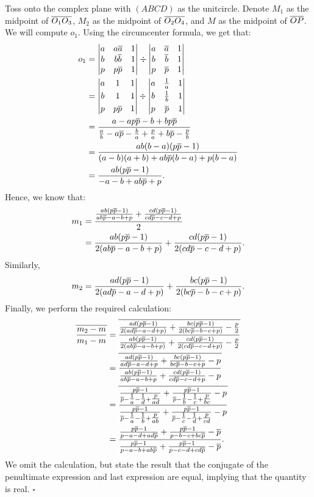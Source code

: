 \documentclass{article}
\begin{document}
Toss onto the complex plane with $(ABCD)$ as the unitcircle. Denote $M_1$ as the midpoint of $\overline{O_1O_3}$, $M_2$ as the midpoint of $\overline{O_2O_4}$, and $M$ as the midpoint of $\overline{OP}$. We will compute $o_1$. Using the circumcenter formula, we get that:
{\allowdisplaybreaks
\begin{align*}
o_1 &= \begin{vmatrix}a&a\overline{a}&1\\b&b\overline{b}&1\\p&p\overline{p}&1\end{vmatrix} \div \begin{vmatrix}a&\overline{a}&1\\b&\overline{b}&1\\p&\overline{p}&1\end{vmatrix} \\
&= \begin{vmatrix}a&1&1\\[3pt]b&1&1\\[3pt]p&p\overline{p}&1\end{vmatrix} \div \begin{vmatrix}a&\tfrac{1}{a}&1\\[3pt]b&\tfrac{1}{b}&1\\[3pt]p&\overline{p}&1\end{vmatrix} \\
&= \dfrac{a-ap\overline{p}-b+bp\overline{p}}{\tfrac{a}{b}-a\overline{p}-\tfrac{b}{a}+\tfrac{p}{a}+b\overline{p}-\tfrac{p}{b}} \\
&= \dfrac{ab(b-a)(p\overline{p}-1)}{(a-b)(a+b)+ab\overline{p}(b-a)+p(b-a)} \\
&= \dfrac{ab(p\overline{p}-1)}{-a-b+ab\overline{p}+p}.
\end{align*}
}
Hence, we know that:
\begin{align*}
m_1 &= \dfrac{\tfrac{ab(p\overline{p}-1)}{ab\overline{p}-a-b+p}+\tfrac{cd(p\overline{p}-1)}{cd\overline{p}-c-d+p}}{2} \\
&= \dfrac{ab(p\overline{p}-1)}{2(ab\overline{p}-a-b+p)}+\dfrac{cd(p\overline{p}-1)}{2(cd\overline{p}-c-d+p)}.
\end{align*}
Similarly, \[m_2 = \dfrac{ad(p\overline{p}-1)}{2(ad\overline{p}-a-d+p)}+\dfrac{bc(p\overline{p}-1)}{2(bc\overline{p}-b-c+p)}.\] Finally, we perform the required calculation:
\begin{align*}
\overline{\dfrac{m_2-m}{m_1-m}} &= \overline{\dfrac{\tfrac{ad(p\overline{p}-1)}{2(ad\overline{p}-a-d+p)}+\tfrac{bc(p\overline{p}-1)}{2(bc\overline{p}-b-c+p)}-\tfrac{p}{2}}{\tfrac{ab(p\overline{p}-1)}{2(ab\overline{p}-a-b+p)}+\tfrac{cd(p\overline{p}-1)}{2(cd\overline{p}-c-d+p)}-\tfrac{p}{2}}} \\
&= \overline{\dfrac{\tfrac{ad(p\overline{p}-1)}{ad\overline{p}-a-d+p}+\tfrac{bc(p\overline{p}-1)}{bc\overline{p}-b-c+p}-p}{\tfrac{ab(p\overline{p}-1)}{ab\overline{p}-a-b+p}+\tfrac{cd(p\overline{p}-1)}{cd\overline{p}-c-d+p}-p}} \\
&= \overline{\dfrac{\tfrac{p\overline{p}-1}{\overline{p}-\tfrac{1}{a}-\tfrac{1}{d}+\tfrac{p}{ad}}+\tfrac{p\overline{p}-1}{\overline{p}-\tfrac{1}{b}-\tfrac{1}{c}+\tfrac{p}{bc}}-p}{\tfrac{p\overline{p}-1}{\overline{p}-\tfrac{1}{a}-\tfrac{1}{b}+\tfrac{p}{ab}}+\tfrac{p\overline{p}-1}{\overline{p}-\tfrac{1}{c}-\tfrac{1}{d}+\tfrac{p}{cd}}-p}} \\
&= \dfrac{\tfrac{p\overline{p}-1}{p-a-d+ad\overline{p}}+\tfrac{p\overline{p}-1}{p-b-c+bc\overline{p}}-\overline{p}}{\tfrac{p\overline{p}-1}{p-a-b+ab\overline{p}}+\tfrac{p\overline{p}-1}{p-c-d+cd\overline{p}}-\overline{p}}.
\end{align*}
We omit the calculation, but state the result that the conjugate of the penultimate expression and last expression are equal, implying that the quantity is real. $\square$
\end{document}
